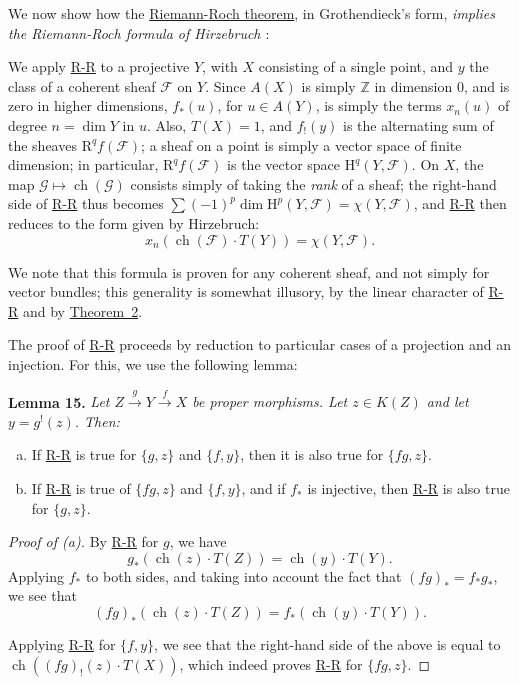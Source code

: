 \documentclass{article}
\newenvironment{itenv}[1]
  {\phantomsection\par\medskip\noindent\textbf{#1.}\itshape}
  {\par\medskip}
\newcommand{\scr}[1]{{\mathscr{#1}}}
\newcommand{\HH}{\mathrm{H}}
\newcommand{\RR}{\mathrm{R}}
\DeclareMathOperator{\ch}{ch}
\newcommand{\oldpage}[1]{\marginpar{\footnotesize$\Big\vert$ \textit{p.~#1}}}
\begin{document}
We now show how the \hyperref[theoremriemannroch]{Riemann-Roch theorem}, in Grothendieck's form, \emph{implies the Riemann-Roch formula of Hirzebruch \cite{9}}:

We apply \hyperref[theoremriemannroch]{R-R} to a projective $Y$, with $X$ consisting of a single point, and $y$ the class of a coherent sheaf $\scr{F}$ on $Y$.
Since $A(X)$ is simply $\mathbb{Z}$ in dimension $0$, and is zero in higher dimensions, $f_*(u)$, for $u\in A(Y)$, is simply the terms $x_n(u)$ of degree $n=\dim Y$ in $u$.
Also, $T(X)=1$, and $f_!(y)$ is the alternating sum of the sheaves $\RR^qf(\scr{F})$;
a sheaf on a point is simply a vector space of finite dimension;
in particular, $\RR^qf(\scr{F})$ is the vector space $\HH^q(Y,\scr{F})$.
On $X$, the map $\scr{G}\mapsto\ch(\scr{G})$ consists simply of taking the \emph{rank} of a sheaf;
the right-hand side of \hyperref[theoremriemannroch]{R-R} thus becomes $\sum(-1)^p\dim\HH^p(Y,\scr{F}) = \chi(Y,\scr{F})$, and \hyperref[theoremriemannroch]{R-R} then reduces to the form given by Hirzebruch:
\[
  x_n(\ch(\scr{F})\cdot T(Y)) = \chi(Y,\scr{F}).
\]

We note that this formula is proven for any coherent sheaf, and not simply for vector bundles;
this generality is somewhat illusory, by the linear character of \hyperref[theoremriemannroch]{R-R} and by \hyperref[theorem2]{Theorem~2}.

The proof of \hyperref[theoremriemannroch]{R-R} proceeds by reduction to particular cases of a projection and an injection.
For this, we use the following lemma:

\begin{itenv}{Lemma 15}
\label{lemma15}
  Let $Z\xrightarrow{g}Y\xrightarrow{f}X$ be proper morphisms.
  Let $z\in K(Z)$ and let $y=g^!(z)$. Then:
  \begin{enumerate}[(a)]
    \item If \hyperref[theoremriemannroch]{R-R} is true for $\{g,z\}$ and $\{f,y\}$, then it is also true for $\{fg,z\}$.
    \item If \hyperref[theoremriemannroch]{R-R} is true of $\{fg,z\}$ and $\{f,y\}$, and if $f_*$ is injective, then \hyperref[theoremriemannroch]{R-R} is also true for $\{g,z\}$.
  \end{enumerate}
\end{itenv}

\begin{proof}[Proof of (a)]
  By \hyperref[theoremriemannroch]{R-R} for $g$, we have
  \[
    g_*(\ch(z)\cdot T(Z)) = \ch(y)\cdot T(Y).
  \]
  \oldpage{114}
  Applying $f_*$ to both sides, and taking into account the fact that $(fg)_*=f_*g_*$, we see that
  \[
    (fg)_*(\ch(z)\cdot T(Z)) = f_*(\ch(y)\cdot T(Y)).
  \]

  Applying \hyperref[theoremriemannroch]{R-R} for $\{f,y\}$, we see that the right-hand side of the above is equal to $\ch((fg)_!(z)\cdot T(X))$, which indeed proves \hyperref[theoremriemannroch]{R-R} for $\{fg,z\}$.
\end{proof}
\end{document}
